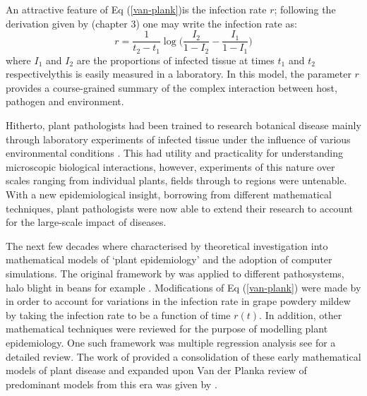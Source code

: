 An attractive feature of Eq (\ref{van-plank})is the infection rate $r$; following the derivation given by \cite{van2013plant} (chapter 3) one may write the infection rate as:
\begin{equation*}
    r =\frac{1}{t_2 - t_1} \log \Big(\frac{I_2}{1 - I_2} - \frac{I_1}{1 - I_1}\Big)
\end{equation*}
where $I_1$ and $I_2$ are the proportions of infected tissue at times $t_1$ and $t_2$ respectively\textemdash this is easily measured in a laboratory. In this model, the parameter $r$ provides a course-grained summary of the complex interaction between host, pathogen and environment. 

Hitherto, plant pathologists had been trained to research botanical disease mainly through laboratory experiments of infected tissue under the influence of various environmental conditions \cite{doi:10.1146/annurev.py.01.090163.000245}. This had utility and practicality for understanding microscopic biological interactions, however, experiments of this nature over scales ranging from individual plants, fields through to regions were untenable. With a new epidemiological insight, borrowing from different mathematical techniques, plant pathologists were now able to extend their research to account for the large-scale impact of diseases. 

The next few decades where characterised by theoretical investigation into mathematical models of `plant epidemiology' and the adoption of computer simulations. The original framework by \cite{van2013plant} was applied to different pathosystems, halo blight in beans for example \cite{doi:10.1111/j.1744-7348.1979.tb06527.x}. Modifications of Eq (\ref{van-plank}) were made by \cite{sall1980epidemiology} in order to account for variations in the infection rate in grape powdery mildew by taking the infection rate to be a function of time $r(t)$. In addition, other mathematical techniques were reviewed for the purpose of modelling plant epidemiology. One such framework was multiple regression analysis see \cite{butt1974multiple} for a detailed review. The work of \cite{zadoks1979epidemiology} provided a consolidation of these early mathematical models of plant disease and expanded upon Van der Plank\textemdash a review of predominant models from this era was given by \cite{jeger1984use}.

